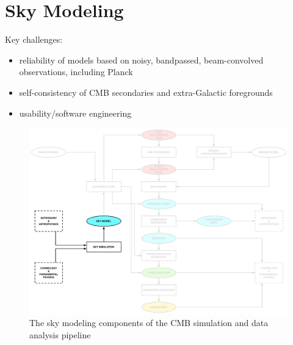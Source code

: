 
\section{Sky Modeling}

Key challenges: 
\begin{itemize} 
\item reliability of models based on noisy, bandpassed, beam-convolved observations, including Planck
\item self-consistency of CMB secondaries and extra-Galactic foregrounds
\item usability/software engineering
\end{itemize} 

\begin{figure}[htbp]
\centering
\includegraphics[width=1\textwidth]{Analysis/sm}
\caption{The sky modeling components of the CMB simulation and data analysis pipeline}
\label{default}

\end{figure}

%



